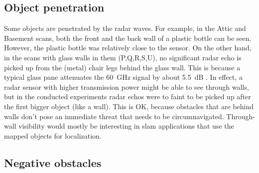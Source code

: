 \subsection{Object penetration}\label{object-penetration}

Some objects are penetrated by the radar waves. For example, in the
Attic and Basement scans, both the front and the back wall of a
plastic bottle can be seen. However, the plastic bottle was relatively
close to the sensor. On the other hand, in the scans with glass walls in
them (P,Q,R,S,U), no significant radar echo is picked up from the
(metal) chair legs behind the glass wall. This is because a typical
glass pane attenuates the \SI{60}{GHz} signal by about \SI{5.5}{dB} \cite{Lu2014}. In
effect, a radar sensor with higher transmission power might be able to
see through walls, but in the conducted experiments radar echos were to
faint to be picked up after the first bigger object (like a wall).
This is OK, because obstacles that are behind walls don't pose an immediate threat that needs to be circumnavigated. Through-wall visibility would mostly be interesting in slam applications that use the mapped objects for localization.

\subsection{Negative obstacles}\label{negative-obstacles}

